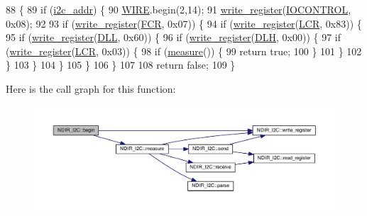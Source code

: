 \begin{DoxyCode}
88 \{
89     \textcolor{keywordflow}{if} (\hyperlink{class_n_d_i_r___i2_c_aac12069dd5a86a9ec6aa31ac9a44aabe}{i2c\_addr}) \{
90         \hyperlink{_cool_n_d_i_r___i2_c_8cpp_a5fb65319d8f31c75826267805bb435d1}{WIRE}.begin(2,14);
91         \hyperlink{class_n_d_i_r___i2_c_a5de6a044b00e985f035edca07521e319}{write\_register}(\hyperlink{_cool_n_d_i_r___i2_c_8cpp_a18ad5a108ad9fd33f7ad5831d6feb493}{IOCONTROL}, 0x08);
92 
93         \textcolor{keywordflow}{if} (\hyperlink{class_n_d_i_r___i2_c_a5de6a044b00e985f035edca07521e319}{write\_register}(\hyperlink{_cool_n_d_i_r___i2_c_8cpp_a264b36b13386e3f62fe69e04711bc006}{FCR}, 0x07)) \{
94             \textcolor{keywordflow}{if} (\hyperlink{class_n_d_i_r___i2_c_a5de6a044b00e985f035edca07521e319}{write\_register}(\hyperlink{_cool_n_d_i_r___i2_c_8cpp_a851cb396b6eaa97346364a772b439f37}{LCR}, 0x83)) \{
95                 \textcolor{keywordflow}{if} (\hyperlink{class_n_d_i_r___i2_c_a5de6a044b00e985f035edca07521e319}{write\_register}(\hyperlink{_cool_n_d_i_r___i2_c_8cpp_a4466639cd64ebf372a621168c5e25964}{DLL}, 0x60)) \{
96                     \textcolor{keywordflow}{if} (\hyperlink{class_n_d_i_r___i2_c_a5de6a044b00e985f035edca07521e319}{write\_register}(\hyperlink{_cool_n_d_i_r___i2_c_8cpp_a1d5ca5c79b120db0edb1150cc4dbe732}{DLH}, 0x00)) \{
97                         \textcolor{keywordflow}{if} (\hyperlink{class_n_d_i_r___i2_c_a5de6a044b00e985f035edca07521e319}{write\_register}(\hyperlink{_cool_n_d_i_r___i2_c_8cpp_a851cb396b6eaa97346364a772b439f37}{LCR}, 0x03)) \{
98                             \textcolor{keywordflow}{if} (\hyperlink{class_n_d_i_r___i2_c_ab8f50d38501d498b802b822bd4844ede}{measure}()) \{
99                                 \textcolor{keywordflow}{return} \textcolor{keyword}{true};
100                             \}
101                         \}
102                     \}
103                 \}
104             \}
105         \}
106     \}
107 
108     \textcolor{keywordflow}{return} \textcolor{keyword}{false};
109 \}
\end{DoxyCode}
Here is the call graph for this function\+:\nopagebreak
\begin{figure}[H]
\begin{center}
\leavevmode
\includegraphics[width=350pt]{d6/ddb/class_n_d_i_r___i2_c_acf82f3dcb41e75709a93f8b68d087a3c_cgraph}
\end{center}
\end{figure}
\mbox{\label{class_n_d_i_r___i2_c_ab8f50d38501d498b802b822bd4844ede}} 
